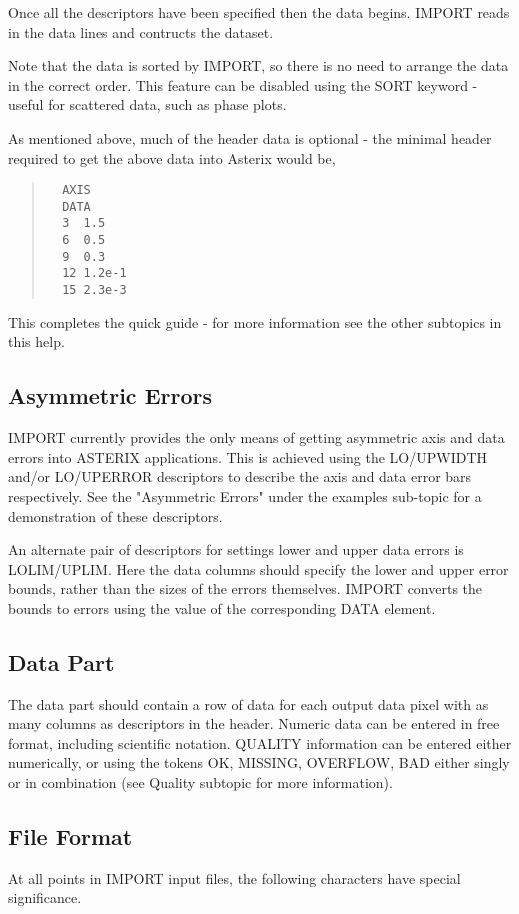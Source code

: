 \documentclass{book}
\renewcommand{\_}{{\tt\char'137}}     %
\begin{document}
Once all the descriptors have been specified then the data
begins. IMPORT reads in the data lines and contructs the dataset.
 
Note that the data is sorted by IMPORT, so there is no need to
arrange the data in the correct order. This feature can be
disabled using the SORT keyword - useful for scattered data,
such as phase plots.
 
As mentioned above, much of the header data is optional - the
minimal header required to get the above data into Asterix
would be,
 
\begin{quote}\begin{verbatim}
  AXIS
  DATA
  3  1.5
  6  0.5
  9  0.3
  12 1.2e-1
  15 2.3e-3
\end{verbatim}\end{quote}
This completes the quick guide - for more information see the
other subtopics in this help.
 
\subsection{Asymmetric Errors}
IMPORT currently provides the only means of getting asymmetric
axis and data errors into ASTERIX applications. This is achieved
using the LO/UPWIDTH and/or LO/UPERROR descriptors to describe
the axis and data error bars respectively. See the "Asymmetric
Errors" under the examples sub-topic for a demonstration of
these descriptors.
 
An alternate pair of descriptors for settings lower and upper
data errors is LOLIM/UPLIM. Here the data columns should specify
the lower and upper error bounds, rather than the sizes of the
errors themselves. IMPORT converts the bounds to errors using the
value of the corresponding DATA element.
 
\subsection{Data Part}
The data part should contain a row of data for each output data
pixel with as many columns as descriptors in the header. Numeric
data can be entered in free format, including scientific notation.
QUALITY information can be entered either numerically, or using
the tokens OK, MISSING, OVERFLOW, BAD either singly or in
combination (see Quality subtopic for more information).
 
\subsection{File Format}
At all points in IMPORT input files, the following characters
have special significance.
 
\end{document}
